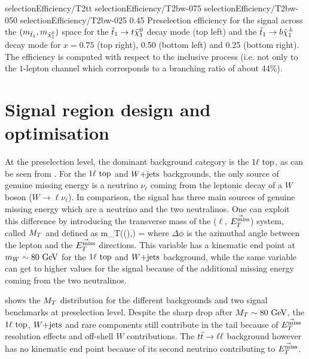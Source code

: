                           {selectionEfficiency/T2tt}
                          {selectionEfficiency/T2bw-075}
                          {selectionEfficiency/T2bw-050}
                          {selectionEfficiency/T2bw-025}
                          {0.45}
                          {Preselection efficiency for the signal across the $(m_{\tilde{t}_1},
                          m_{\tilde{\chi}_1^0})$ space for the $\tilde{t}_1 \rightarrow t \tilde{\chi}_1^0$
                          decay mode (top left) and the $\tilde{t}_1 \rightarrow b \tilde{\chi}_1^\pm$
                          decay mode for $x = 0.75$ (top right), 0.50 (bottom left) and 0.25
                          (bottom right). The efficiency is computed with respect to the
                          inclusive process (i.e. not only to the $1$-lepton channel which
                          corresponds to a branching ratio of about 44\%).}

    \section{Signal region design and optimisation \label{sec:analysis_optimization}}

    At the preselection level, the dominant background category is the $1\ell~\text{top}$,
    as can be seen from .
    For the $1\ell~\text{top}$ and $\text{$W$+jets}$ backgrounds, the only source of genuine missing
    energy is a neutrino $\nu_\ell$ coming from the leptonic decay of a $W$ boson ($W
    \rightarrow \ell \nu_{\ell}$). In comparison, the signal has three main sources of
    genuine missing energy which are a neutrino and the two neutralinos.
    One can exploit this difference by introducing the transverse mass of the ($\ell$,
    $\vec{E_T^\text{miss}}$) system, called $M_T$ and defined as
    {
        \MT
        m_T((\ell),\vec{\MET})
        =
    }
    where $\Delta \phi$ is the azimuthal angle between the lepton and the $\vec{E_T^\text{miss}}$
    directions. This variable has a kinematic end point at $m_{W} \sim 80~\text{GeV}$ for the $1\ell~\text{top}$
    and $\text{$W$+jets}$ background, while the same variable can get to higher values for the signal
    because of the additional missing energy coming from the two neutralinos.

     shows the $M_T$ distribution for the different
    backgrounds and two signal benchmarks at preselection level. Despite the sharp drop after
    $M_T \sim 80~\text{GeV}$, the $1\ell~\text{top}$, $\text{$W$+jets}$ and rare components still contribute
    in the tail because of $\vec{E_T^\text{miss}}$ resolution effects and off-shell $W$ contributions.
    The $t\bar{t} \rightarrow \ell \ell$ background however has no kinematic end point because of its second
    neutrino contributing to $\vec{E_T^\text{miss}}$.

